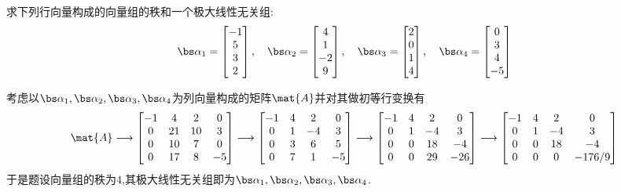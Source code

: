 \documentclass{ctexart}
\begin{document}
\pagestyle{empty}
\begin{center}
\end{center}
\begin{homework}[1]
    求下列行向量构成的向量组的秩和一个极大线性无关组:
    \[\bs\alpha_1=\begin{bmatrix}
        -1\\5\\3\\2
    \end{bmatrix},\quad\bs\alpha_2=\begin{bmatrix}
        4\\1\\-2\\9
    \end{bmatrix},\quad\bs\alpha_3=\begin{bmatrix}
        2\\0\\1\\4
    \end{bmatrix},\quad\bs\alpha_4=\begin{bmatrix}
        0\\3\\4\\-5
    \end{bmatrix}\]
\end{homework}
\begin{solution}
    考虑以$\bs\alpha_1,\bs\alpha_2,\bs\alpha_3,\bs\alpha_4$为列向量构成的矩阵$\mat{A}$并对其做初等行变换有
    \[\mat{A}\longrightarrow\begin{bmatrix}
        -1&4&2&0\\
        0&21&10&3\\
        0&10&7&0\\
        0&17&8&-5
    \end{bmatrix}\longrightarrow\begin{bmatrix}
        -1&4&2&0\\
        0&1&-4&3\\
        0&3&6&5\\
        0&7&1&-5
    \end{bmatrix}\longrightarrow\begin{bmatrix}
        -1&4&2&0\\
        0&1&-4&3\\
        0&0&18&-4\\
        0&0&29&-26
    \end{bmatrix}\longrightarrow\begin{bmatrix}
        -1&4&2&0\\
        0&1&-4&3\\
        0&0&18&-4\\
        0&0&0&-176/9
    \end{bmatrix}\]
    于是题设向量组的秩为$4$,其极大线性无关组即为$\bs\alpha_1,\bs\alpha_2,\bs\alpha_3,\bs\alpha_4$.
\end{solution}
\end{document}
